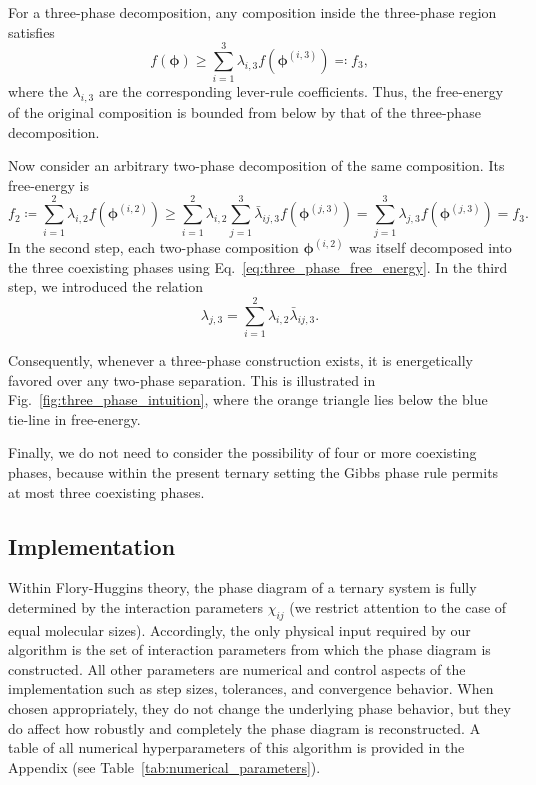 \documentclass[12pt]{article}
\begin{document}
For a three-phase decomposition, any composition inside the three-phase region satisfies
\begin{equation}
f(\boldsymbol\phi) \geq \sum_{i=1}^3 \lambda_{i,3} f(\boldsymbol{\phi}^{(i,3)}) \eqcolon f_3,
\label{eq:three_phase_free_energy}
\end{equation}
where the \(\lambda_{i,3}\) are the corresponding lever-rule coefficients.
Thus, the free-energy of the original composition is bounded from below by that of the three-phase decomposition.

Now consider an arbitrary two-phase decomposition of the same composition. Its free-energy is
\[
f_2 \coloneq \sum_{i=1}^2 \lambda_{i,2} f(\boldsymbol{\phi}^{(i,2)})
\geq
\sum_{i=1}^2 \lambda_{i,2}\sum_{j=1}^3 \bar\lambda_{ij,3} f(\boldsymbol{\phi}^{(j,3)})
=
\sum_{j=1}^3 \lambda_{j,3} f(\boldsymbol{\phi}^{(j,3)})
=
f_3.
\]
In the second step, each two-phase composition \(\boldsymbol{\phi}^{(i,2)}\) was itself decomposed into the three coexisting phases using Eq.~\eqref{eq:three_phase_free_energy}. In the third step, we introduced the relation
\[
\lambda_{j,3} = \sum_{i=1}^2 \lambda_{i,2} \bar\lambda_{ij,3}.
\]


Consequently, whenever a three-phase construction exists, it is energetically favored over any two-phase separation.
This is illustrated in Fig.~\ref{fig:three_phase_intuition}, where the orange triangle lies below the blue tie-line in free-energy.

Finally, we do not need to consider the possibility of four or more coexisting phases, because within the present ternary setting the Gibbs phase rule \cite{GibbsPhaseRule} permits at most three coexisting phases. 

\subsection{Implementation}

Within Flory-Huggins theory, the phase diagram of a ternary system is fully determined by the interaction parameters \(\chi_{ij}\) (we restrict attention to the case of equal molecular sizes).
Accordingly, the only physical input required by our algorithm is the set of interaction parameters from which the phase diagram is constructed.
All other parameters are numerical and control aspects of the implementation such as step sizes, tolerances, and convergence behavior.
When chosen appropriately, they do not change the underlying phase behavior, but they do affect how robustly and completely the phase diagram is reconstructed. 
A table of all numerical hyperparameters of this algorithm is provided in the Appendix (see Table~\ref{tab:numerical_parameters}).
\end{document}
